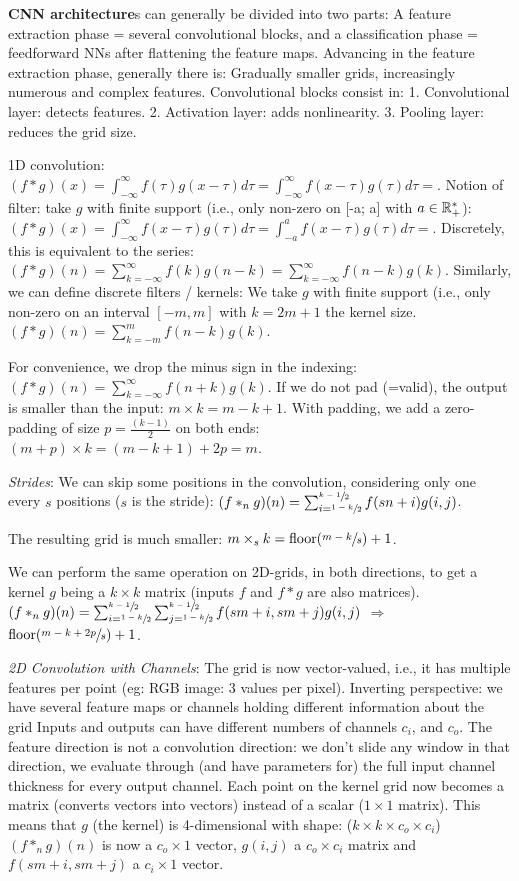 \textbf{CNN architecture}s can generally be divided into two parts:
A feature extraction phase = several convolutional blocks, and a classification phase = feedforward NNs after flattening the feature maps.
Advancing in the feature extraction phase, generally there is: Gradually smaller grids,
increasingly numerous and complex features.
Convolutional blocks consist in:
1. Convolutional layer: detects features. 
2. Activation layer: adds nonlinearity.
3. Pooling layer: reduces the grid size.

1D convolution: $(f*g)(x)=\int_{-\infty}^{\infty} f(\tau) g(x-\tau) d\tau = \int_{-\infty}^{\infty} f(x-\tau) g(\tau) d\tau = $.
Notion of filter: take $g$ with finite support (i.e., only non-zero on [-a; a] with $a \in \mathbb{R}_+^*$):
$(f*g)(x)=\int_{-\infty}^{\infty} f(x-\tau) g(\tau) d\tau = \int_{-a}^{a} f(x-\tau) g(\tau) d\tau = $.
Discretely, this is equivalent to the series: 
$(f*g)(n)= \sum_{k=-\infty}^{\infty} f(k)g(n-k) =  \sum_{k=-\infty}^{\infty} f(n-k)g(k)$.
Similarly, we can define discrete filters / kernels:
We take $g$ with finite support (i.e., only non-zero on an interval $[-m,m]$ with $k=2m+1$ the kernel size. $(f*g)(n)= \sum_{k=-m}^{m} f(n-k)g(k)$.

For convenience, we drop the minus sign in the indexing: $(f*g)(n)= \sum_{k=-\infty}^{\infty} f(n+k)g(k)$.
If we do not pad (=valid), the output is smaller than the input:
$m\times k=m-k+1$.
With  padding, we add a zero-padding of size $p=\frac{(k-1)}{2}$ on both ends: $(m+p)\times k = (m-k+1)+2p = m$.

\textit{Strides}: We can skip some positions in the convolution, considering only one every $s$ positions ($s$ is the stride):
$(f*_n g)(n)= \sum_{i=\sfrac{1-k}{2}}^{\sfrac{k-1}{2}} f(sn+i)g(i,j)$.

The resulting grid is much smaller: $m\times_s k = \mathrm{floor}{(\sfrac{m-k}{s})}+1$.

We can perform the same operation on 2D-grids, in both directions, to get a kernel $g$ being a $k\times k$ matrix (inputs $f$ and $f*g$ are also matrices).
$(f*_n g)(n)= \sum_{i=\sfrac{1-k}{2}}^{\sfrac{k-1}{2}} \sum_{j=\sfrac{1-k}{2}}^{\sfrac{k-1}{2}} f(sm+i, sm+j)g(i,j)$ $\Rightarrow$ $\mathrm{floor}{(\sfrac{m-k+2p}{s})}+1$.

\textit{2D Convolution with Channels}: 
The grid is now vector-valued, i.e., it has multiple features per point (eg: RGB image: 3 values per pixel).
Inverting perspective: we have several feature maps or channels holding different information about the grid
Inputs and outputs can have different numbers of channels $c_i$, and $c_o$.
The feature direction is not a convolution direction: we don’t slide any window in that direction, we evaluate through (and have parameters for) the full input channel thickness for every output channel.
Each point on the kernel grid now becomes a matrix (converts vectors into vectors) instead of a scalar ($1\times 1$ matrix).
This means that $g$ (the kernel) is 4-dimensional with shape: ($k \times k \times c_o \times c_i$)
$(f*_n g)(n)$ is now a $c_o\times 1$ vector, $g(i,j)$ a $c_o \times c_i$ matrix and $f(sm+i, sm+j)$ a $c_i\times 1$ vector.

